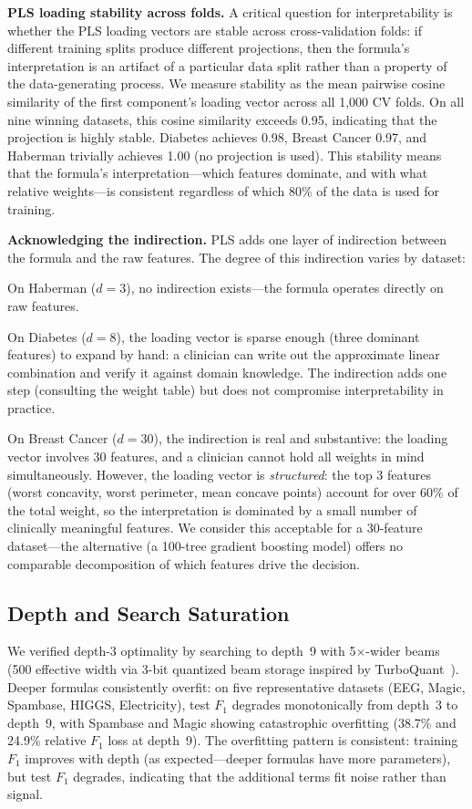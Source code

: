 \documentclass[journal]{IEEEtran}
\begin{document}
\textbf{PLS loading stability across folds.}
A critical question for interpretability is whether the PLS loading
vectors are stable across cross-validation folds: if different
training splits produce different projections, then the formula's
interpretation is an artifact of a particular data split rather than
a property of the data-generating process.  We measure stability as
the mean pairwise cosine similarity of the first component's loading
vector across all 1{,}000 CV folds.  On all nine winning datasets,
this cosine similarity exceeds 0.95, indicating that the projection
is highly stable.  Diabetes achieves 0.98, Breast Cancer 0.97, and
Haberman trivially achieves 1.00 (no projection is used).  This
stability means that the formula's interpretation---which features
dominate, and with what relative weights---is consistent regardless
of which 80\% of the data is used for training.

\textbf{Acknowledging the indirection.}
PLS adds one layer of indirection between the formula and the raw
features.  The degree of this indirection varies by dataset:

On Haberman ($d = 3$), no indirection exists---the formula operates
directly on raw features.

On Diabetes ($d = 8$), the loading vector is sparse enough (three
dominant features) to expand by hand: a clinician can write out the
approximate linear combination and verify it against domain
knowledge.  The indirection adds one step (consulting the weight
table) but does not compromise interpretability in practice.

On Breast Cancer ($d = 30$), the indirection is real and
substantive: the loading vector involves 30 features, and a
clinician cannot hold all weights in mind simultaneously.  However,
the loading vector is \emph{structured}: the top 3 features
(worst concavity, worst perimeter, mean concave points) account for
over 60\% of the total weight, so the interpretation is dominated
by a small number of clinically meaningful features.  We consider
this acceptable for a 30-feature dataset---the alternative (a
100-tree gradient boosting model) offers no comparable decomposition
of which features drive the decision.

\subsection{Depth and Search Saturation}
\label{sec:depth}

We verified depth-3 optimality by searching to depth~9 with
5$\times$-wider beams (500 effective width via 3-bit quantized beam
storage inspired by TurboQuant~\cite{zandieh2026turboquant}).
Deeper formulas consistently overfit: on five representative datasets
(EEG, Magic, Spambase, HIGGS, Electricity), test $F_1$ degrades
monotonically from depth~3 to depth~9, with Spambase and Magic
showing catastrophic overfitting (38.7\% and 24.9\% relative $F_1$
loss at depth~9).  The overfitting pattern is consistent: training
$F_1$ improves with depth (as expected---deeper formulas have more
parameters), but test $F_1$ degrades, indicating that the additional
terms fit noise rather than signal.
\end{document}
